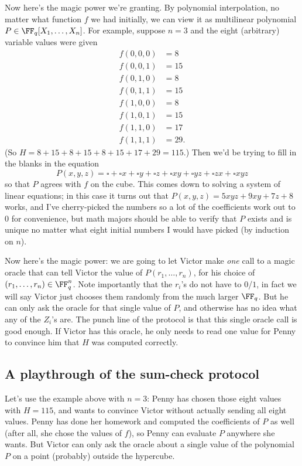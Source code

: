 \documentclass[11pt]{scrreprt}
\begin{document}
Now here's the magic power we're granting.
By polynomial interpolation, no matter what function $f$ we had initially,
we can view it as multilinear polynomial $P \in \FF_q[X_1, \dots, X_n]$.
For example, suppose $n=3$ and the eight (arbitrary) variable values were given
\begin{align*}
  f(0,0,0) &= 8 \\
  f(0,0,1) &= 15 \\
  f(0,1,0) &= 8 \\
  f(0,1,1) &= 15 \\
  f(1,0,0) &= 8 \\
  f(1,0,1) &= 15 \\
  f(1,1,0) &= 17 \\
  f(1,1,1) &= 29.
\end{align*}
(So $H = 8+15+8+15+8+15+17+29 = 115$.)
Then we'd be trying to fill in the blanks in the equation
\[ P(x,y,z) = {\square} + {\square} x + {\square} y + {\square} z
  + {\square} xy + {\square} yz + {\square} zx + {\square} xyz \]
so that $P$ agrees with $f$ on the cube.
This comes down to solving a system of linear equations;
in this case it turns out that $P(x,y,z) = 5xyz + 9xy + 7z + 8$ works,
and I've cherry-picked the numbers so a lot of the coefficients work out to $0$ for
convenience, but math majors should be able to verify that $P$ exists and is unique
no matter what eight initial numbers I would have picked (by induction on $n$).

Now here's the magic power:
we are going to let Victor make \emph{one} call to a magic oracle
that can tell Victor the value of $P(r_1,\dots,r_n)$,
for his choice of $(r_1, \dots, r_n) \in \FF_q^n$.
Note importantly that the $r_i$'s do not have to $0$/$1$,
in fact we will say Victor just chooses them randomly from the much larger $\FF_q$.
But he can only ask the oracle for that single value of $P$,
and otherwise has no idea what any of the $Z_i$'s are.
The punch line of the protocol is that this single oracle call is good enough.
If Victor has this oracle, he only needs to read one value for
Penny to convince him that $H$ was computed correctly.

\subsection{A playthrough of the sum-check protocol}
Let's use the example above with $n=3$:
Penny has chosen those eight values with $H = 115$,
and wants to convince Victor without actually sending all eight values.
Penny has done her homework and computed the coefficients of $P$ as well
(after all, she chose the values of $f$), so Penny can evaluate $P$ anywhere she wants.
But Victor can only ask the oracle about a single value of the polynomial $P$
on a point (probably) outside the hypercube.
\end{document}
